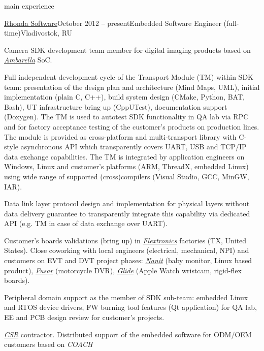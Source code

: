 \documentclass{template}
\begin{document}
\begin{rSection}{main experience}
\begin{rCompany}{\href{http://www.rhondasoftware.com}{Rhonda Software}}{October 2012 -- present}{Embedded Software Engineer (full-time)}{Vladivostok, RU}

\item Camera SDK development team member for digital imaging products based on \href{http://www.ambarella.com}{\textit{Ambarella}} SoC.
\item Full independent development cycle of the Transport Module (TM) within SDK team: presentation of the design plan and architecture
      (Mind Maps, UML), initial implementation (plain C, C++), build system design (CMake, Python, BAT, Bash), UT infrastructure bring up
      (CppUTest), documentation support (Doxygen). The TM is used to autotest SDK functionality in QA lab via RPC and for factory acceptance
      testing of the customer's products on production lines. The module is provided as cross-platform and multi-transport library with C-style
      asynchronous API which transparently covers UART, USB and TCP/IP data exchange capabilities. The TM is integrated by application engineers
      on Windows, Linux and customer's platforms (ARM, ThreadX, embedded Linux) using wide range of supported (cross)compilers (Visual Studio,
      GCC, MinGW, IAR).
\item Data link layer protocol design and implementation for physical layers without data delivery guarantee to transparently integrate this
      capability via dedicated API (e.g. TM in case of data exchange over UART).
\item Customer's boards validations (bring up) in \href{http://www.flextronics.com}{\textit{Flextronics}} factories (TX, United States).
      Close coworking with local engineers (electrical, mechanical, NPI) and customers on EVT and DVT project phases:
      \href{https://www.nanit.com}{\textit{Nanit}} (baby monitor, Linux based product), \href{https://fusar.com}{\textit{Fusar}} (motorcycle
      DVR), \href{http://www.glide.me}{\textit{Glide}} (Apple Watch wristcam, rigid-flex boards).
\item Peripheral domain support as the member of SDK sub-team: embedded Linux and RTOS device drivers, FW burning tool features (Qt application)
      for QA lab, EE and PCB design review for customer's projects.
\item \href{http://www.csr.com}{\textit{CSR}} contractor. Distributed support of the embedded software for ODM/OEM customers based on \textit{COACH}

\end{rCompany}
\end{rSection}
\end{document}
